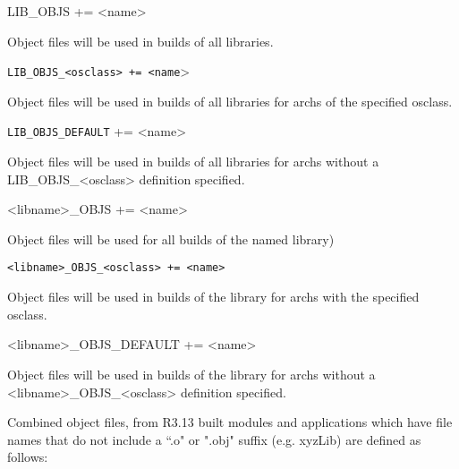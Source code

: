 \begin{description}\item {}LIB\_OBJS += \textless{}name\textgreater{}

\end{description}Object files will be used in builds of all libraries.

\begin{description}\item \verb|LIB_OBJS_<osclass> += <name|\textgreater{}

\end{description}Object files will be used in builds of all libraries for archs of the specified osclass.

\begin{description}\item \verb|LIB_OBJS_DEFAULT| += \textless{}name\textgreater{}

\end{description}Object files will be used in builds of all libraries for archs without a LIB\_OBJS\_\textless{}osclass\textgreater{} definition 
specified.

\begin{description}\item \textless{}libname\textgreater{}\_OBJS += \textless{}name\textgreater{}

\end{description}Object files will be used for all builds of the named library)

\begin{description}\item \verb|<libname>_OBJS_<osclass> += <name>| 

\end{description}Object files will be used in builds of the library for archs with the specified osclass.

\begin{description}\item \textless{}libname\textgreater{}\_OBJS\_DEFAULT += \textless{}name\textgreater{}

\end{description}Object files will be used in builds of the library for archs without a \textless{}libname\textgreater{}\_OBJS\_\textless{}osclass\textgreater{} definition 
specified.



Combined object files, from R3.13 built modules and applications which have file names that do not include a ``.o" or 
".obj" suffix (e.g. xyzLib) are defined as follows:

